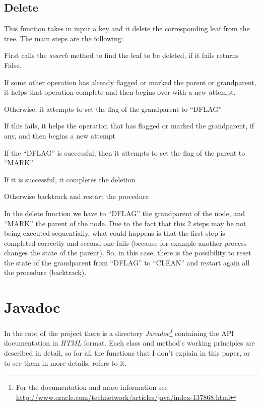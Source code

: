 \documentclass[a4paper]{article}
\begin{document}
\subsection{Delete}
This function takes in input a key and it delete the corresponding leaf from the tree. The main steps are the following:
\begin{compactitem}
  \item First calls the \emph{search} method to find the leaf to be deleted, if it fails returns False.
  \item If some other operation has already flagged or marked the parent or grandparent, it helps that operation complete and then begins over with a new attempt.
  \item Otherwise, it attempts to set the flag of the grandparent to ``DFLAG'' 
    \begin{compactitem}
      \item If this fails, it helps the operation that has flagged or marked the grandparent, if any, and then begins a new attempt
      \item If the ``DFLAG'' is successful, then it attempts to set the flag of the parent to ``MARK''
      \begin{compactitem}
        \item If it is successful, it completes the deletion
        \item Otherwise backtrack and restart the procedure
      \end{compactitem}
    \end{compactitem}
\end{compactitem}

In the delete function we have to ``DFLAG'' the grandparent of the node, and ``MARK'' the parent of the node. Due to the fact that this 2 steps may be not being executed sequentially, what could happens is that the first step is completed correctly and second one fails (because for example another process changes the state of the parent). So, in this case, there is the possibility to reset the state of the grandparent from ``DFLAG'' to ``CLEAN'' and restart again all the procedure (backtrack).


\section{Javadoc}
\label{sec:javadoc}
In the root of the project there is a directory \emph{Javadoc\footnote{For the documentation and more information see \url{http://www.oracle.com/technetwork/articles/java/index-137868.html}}} containing the API documentation in \emph{HTML} format.
Each class and method's working principles are described in detail, so for all the functions that I don't explain in this paper, or to see them in more details, refers to it.
\end{document}
